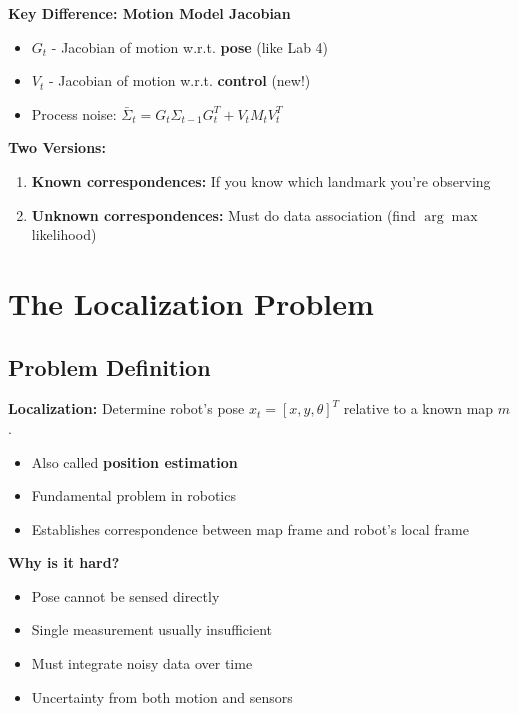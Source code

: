 \begin{tcolorbox}[colback=yellow!10!white,colframe=orange!75!black,title=\textbf{EKF Localization - Fast Reference}]
\vspace{3mm}
\textbf{Key Difference: Motion Model Jacobian}
\begin{itemize}
    \item $G_t$ - Jacobian of motion w.r.t. \textbf{pose} (like Lab 4)
    \item $V_t$ - Jacobian of motion w.r.t. \textbf{control} (new!)
    \item Process noise: $\bar{\Sigma}_t = G_t \Sigma_{t-1} G_t^T + V_t M_t V_t^T$
\end{itemize}

\vspace{3mm}
\textbf{Two Versions:}
\begin{enumerate}
    \item \textbf{Known correspondences:} If you know which landmark you're observing
    \item \textbf{Unknown correspondences:} Must do data association (find $\arg\max$ likelihood)
\end{enumerate}

\end{tcolorbox}

\section{The Localization Problem}

\subsection{Problem Definition}

\textbf{Localization:} Determine robot's pose $x_t = [x, y, \theta]^T$ relative to a known map $m$.

\begin{itemize}
    \item Also called \textbf{position estimation}
    \item Fundamental problem in robotics
    \item Establishes correspondence between map frame and robot's local frame
\end{itemize}

\textbf{Why is it hard?}
\begin{itemize}
    \item Pose cannot be sensed directly
    \item Single measurement usually insufficient
    \item Must integrate noisy data over time
    \item Uncertainty from both motion and sensors
\end{itemize}

